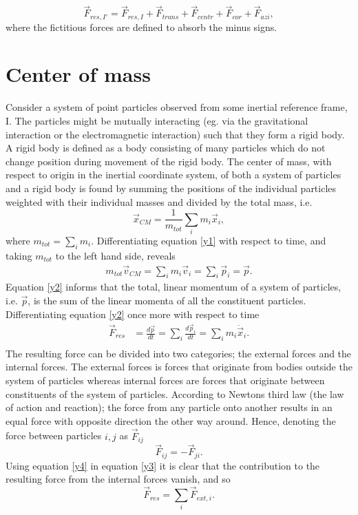 \begin{equation}
	\vec{F}_{res,I'}=\vec{F}_{res,I}+\vec{F}_{trans}+\vec{F}_{centr}+\vec{F}_{cor}+\vec{F}_{azi},
\end{equation} 
where the fictitious forces are defined to absorb the minus signs.

\section{Center of mass}
Consider a system of point particles observed from some inertial reference frame, I. The particles might be mutually interacting (eg. via the gravitational interaction or the electromagnetic interaction) such that they form a rigid body. A rigid body is defined as a body consisting of many particles which do not change position during movement of the rigid body. The center of mass, with respect to origin in the inertial coordinate system, of both a system of particles and a rigid body is found by summing the positions of the individual particles weighted with their individual masses and divided by the total mass,  i.e.
\begin{equation}
	\vec{x}_{CM}=\frac{1}{m_{tot}}\sum_{i}m_i\vec{x}_i,
	\label{y1}
\end{equation} 
where $m_{tot}=\sum_i m_i$. Differentiating equation \eqref{y1} with respect to time, and taking $m_{tot}$ to the left hand side, reveals
\begin{equation}
	\begin{split}
		m_{tot}\vec{v}_{CM}=\sum_im_i\vec{v}_i=\sum_i\vec{p}_i=\vec{p}.
	\end{split}
	\label{y2}
\end{equation} 
Equation \eqref{y2} informs that the total, linear momentum of a system of particles, i.e. $\vec{p}$, is the sum of the linear momenta of all the constituent particles. Differentiating equation \eqref{y2} once more with respect to time
\begin{equation}
	\begin{split}
		\vec{F}_{res}&=\frac{d \vec{p}}{dt}=\sum_i \frac{d \vec{p}_i}{dt}=\sum_i m_i\ddot{\vec{x}}_i.\\
	\end{split}
	\label{y3}
\end{equation} 
The resulting force can be divided into two categories; the external forces and the internal forces. The external forces is forces that originate from bodies outside the system of particles whereas internal forces are forces that originate between constituents of the system of particles. According to Newtons third law (the law of action and reaction); the force from any particle onto another results in an equal force with opposite direction the other way around. Hence, denoting the force between particles $i,j$ as $\vec{F}_{ij}$
\begin{equation}
	\vec{F}_{ij}=-\vec{F}_{ji}.
	\label{y4}
\end{equation} 
Using equation \eqref{y4} in equation \eqref{y3} it is clear that the contribution to the resulting force from the internal forces vanish, and so
\begin{equation}
	\vec{F}_{res}=\sum_i\vec{F}_{ext,i}.
	\label{y5}
\end{equation} 
